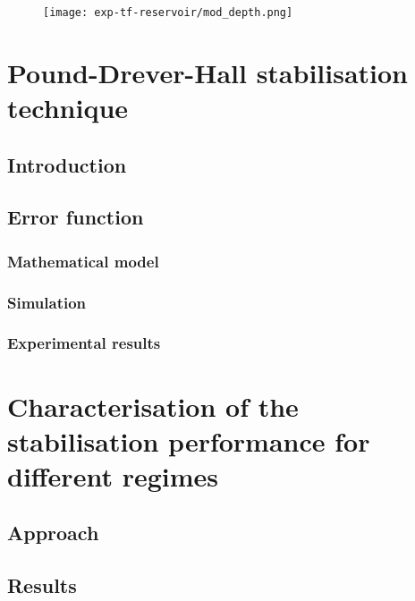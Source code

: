 \begin{figure}
	\centering
	\texttt{[image: exp-tf-reservoir/mod\_depth.png]}
\end{figure}


\section{Pound-Drever-Hall stabilisation technique}

\label{sec-pdh}



\subsection{Introduction}


\subsection{Error function}


\subsubsection{Mathematical model}


\subsubsection{Simulation}


\subsubsection{Experimental results}


\section{Characterisation of the stabilisation performance for different regimes}


\subsection{Approach}


\subsection{Results}